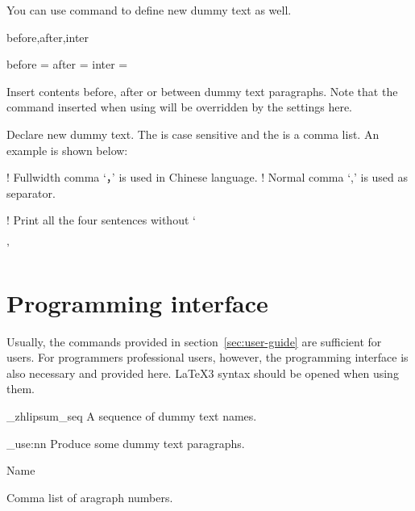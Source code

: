 \documentclass{ctxdoc}
\begin{document}
You can use  command to define new dummy text
as well.

\begin{function}[added=2018-03-29]{before,after,inter}
  \begin{syntax}
    before = 
    after  = 
    inter  = 
  \end{syntax}
  Insert contents before, after or between dummy text paragraphs.
  Note that the  command inserted when using 
  will be overridden by the settings here.
\end{function}

\begin{function}[added=2018-03-29]{\newzhlipsum}
  \begin{syntax}
  \end{syntax}
  Declare new dummy text. The  is case sensitive and
  the  is a comma list. An example is
  shown below:
\end{function}

\begin{ctexexam}
  ! Fullwidth comma `，' is used in Chinese language.
  ! Normal comma `,' is used as separator.

  \zhlipsum*[-][name=jingyesi]  ! Print all the four sentences without `\par'
\end{ctexexam}

\section{Programming interface}

Usually, the commands provided in section~\ref{sec:user-guide}
are sufficient for users. For programmers professional users,
however, the programming interface is also necessary and provided
here. \LaTeX3 syntax should be opened when using them.

\begin{variable}{\g_zhlipsum_seq}
  A sequence of dummy text names.
\end{variable}

\begin{function}{\zhlipsum_use:nn}
  Produce some dummy text paragraphs.
  \begin{arguments}
    \item Name
    \item Comma list of aragraph numbers.
  \end{arguments}
\end{function}
\end{document}
